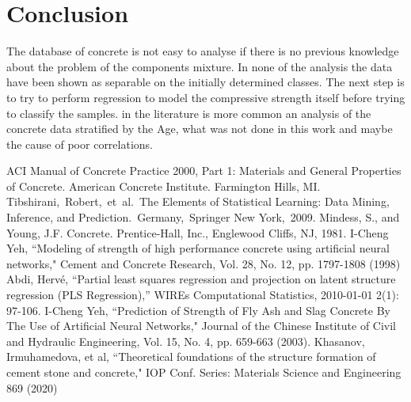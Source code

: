 \documentclass[conference]{IEEEtran}
\begin{document}






\section{Conclusion}\label{conclusions}

The database of concrete is not easy to analyse if there is no previous knowledge about the problem of the components mixture. In none of the analysis the data have been shown as separable on the initially determined classes. The next step is to try to perform regression to model the compressive strength itself before trying to classify the samples. in the literature \cite{b6} is more common an analysis of the concrete data stratified by the Age, what was not done in this work and maybe the cause of poor correlations.

\begin{thebibliography}{00}
 ACI Manual of Concrete Practice 2000, Part 1: Materials and General Properties of Concrete.  American Concrete Institute.  Farmington Hills, MI.
 Tibshirani, Robert, et al. The Elements of  Statistical Learning:  Data Mining, Inference, and Prediction. Germany, Springer New York, 2009.
 Mindess, S., and Young, J.F. Concrete. Prentice-Hall, Inc., Englewood Cliffs, NJ, 1981.
 I-Cheng Yeh, ``Modeling of strength of high performance concrete using artificial neural networks," Cement and Concrete Research, Vol. 28, No. 12, pp. 1797-1808 (1998)
 Abdi, Hervé, ``Partial least squares regression and projection on latent structure regression (PLS Regression),'' WIREs Computational Statistics, 2010-01-01 2(1): 97-106.
 I-Cheng Yeh, ``Prediction of Strength of Fly Ash and Slag Concrete By The Use of Artificial Neural Networks," Journal of the Chinese Institute of Civil and Hydraulic Engineering, Vol. 15, No. 4, pp. 659-663 (2003). 
 Khasanov, Irmuhamedova, et al, ``Theoretical foundations of the structure formation of cement stone
and concrete," IOP Conf. Series: Materials Science and Engineering 869 (2020)
\end{thebibliography}
\end{document}
